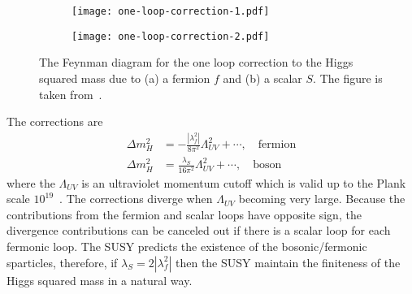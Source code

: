 \begin{figure}[htbp]
    \begin{center}
        \begin{subfigure}[b]{0.48\textwidth}
            \begin{center}
                \texttt{[image: one-loop-correction-1.pdf]}
                \caption{}
            \end{center}
        \end{subfigure}%
        \begin{subfigure}[b]{0.48\textwidth}
            \begin{center}
                \texttt{[image: one-loop-correction-2.pdf]}
                \caption{}
            \end{center}
        \end{subfigure}
    \end{center}
    \caption{The Feynman diagram for the one loop correction to the Higgs squared mass due to (a) a fermion $f$ and (b) a scalar $S$.
    The figure is taken from~\cite{Martin:1997ns}.}
    \label{fig:susy_one_loop_corrections}
\end{figure}

The corrections are
%
\begin{align}
    \Delta m_{H}^{2} &= - \frac{|\lambda_{f}^{2}|}{8\pi^{2}} \Lambda_{UV}^{2} + \cdots, \quad \mathrm{fermion}\\
    \Delta m_{H}^{2} &= \frac{\lambda_{S}}{16\pi^{2}} \Lambda_{UV}^{2} + \cdots, \quad \mathrm{boson}
\end{align}
%
where the $\Lambda_{UV}$ is an ultraviolet momentum cutoff which is valid up to the Plank scale $10^{19}$~{\GeV}.
The corrections diverge when $\Lambda_{UV}$ becoming very large.
Because the contributions from the fermion and scalar loops have opposite sign, the divergence contributions can be canceled out if there is a scalar loop for each fermonic loop.
The SUSY predicts the existence of the bosonic/fermonic sparticles, therefore, if $\lambda_{S} = 2 |\lambda_{f}^{2}|$ then the SUSY maintain the finiteness of the Higgs squared mass in a natural way.

